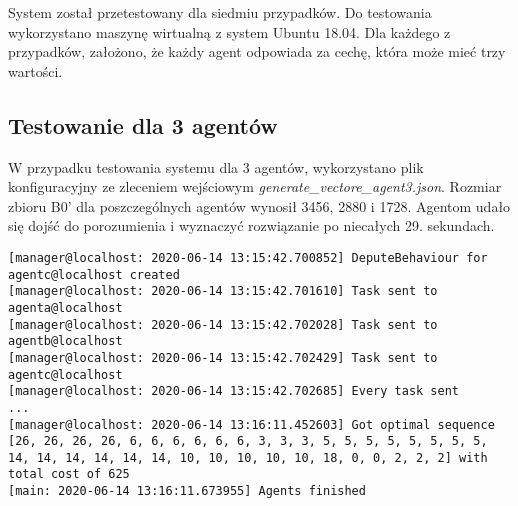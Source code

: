 System został przetestowany dla siedmiu przypadków. Do testowania wykorzystano maszynę wirtualną z system Ubuntu 18.04. Dla każdego z przypadków, założono, że każdy agent odpowiada za cechę, która może mieć trzy wartości.
\subsection{Testowanie dla 3 agentów}
W przypadku testowania systemu dla 3 agentów, wykorzystano plik konfiguracyjny ze zleceniem wejściowym \textit{generate\_vectore\_agent3.json}. Rozmiar zbioru B0' dla poszczególnych agentów wynosił 3456, 2880 i 1728. Agentom udało się dojść do porozumienia i wyznaczyć rozwiązanie po niecałych 29. sekundach.
\begin{lstlisting}
[manager@localhost: 2020-06-14 13:15:42.700852] DeputeBehaviour for agentc@localhost created
[manager@localhost: 2020-06-14 13:15:42.701610] Task sent to agenta@localhost
[manager@localhost: 2020-06-14 13:15:42.702028] Task sent to agentb@localhost
[manager@localhost: 2020-06-14 13:15:42.702429] Task sent to agentc@localhost
[manager@localhost: 2020-06-14 13:15:42.702685] Every task sent
...
[manager@localhost: 2020-06-14 13:16:11.452603] Got optimal sequence [26, 26, 26, 26, 6, 6, 6, 6, 6, 6, 3, 3, 3, 5, 5, 5, 5, 5, 5, 5, 5, 14, 14, 14, 14, 14, 14, 10, 10, 10, 10, 10, 18, 0, 0, 2, 2, 2] with total cost of 625
[main: 2020-06-14 13:16:11.673955] Agents finished
\end{lstlisting}

